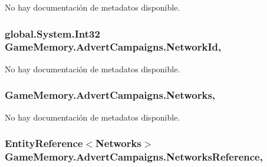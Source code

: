 No hay documentación de metadatos disponible. 

\hypertarget{class_game_memory_1_1_advert_campaigns_ab1f17469e47f312a306fcb0b971a51d8}{
\subsubsection[{Network\-Id}]{\setlength{\rightskip}{0pt plus 5cm}global.\-System.\-Int32 Game\-Memory.\-Advert\-Campaigns.\-Network\-Id\hspace{0.3cm}{\ttfamily [get]}, {\ttfamily [set]}}}\label{class_game_memory_1_1_advert_campaigns_ab1f17469e47f312a306fcb0b971a51d8}


No hay documentación de metadatos disponible. 

\hypertarget{class_game_memory_1_1_advert_campaigns_a93fb9fb1604fb97b196e6cd7186270cf}{
\subsubsection[{Networks}]{ Game\-Memory.\-Advert\-Campaigns.\-Networks\hspace{0.3cm}{\ttfamily [get]}, {\ttfamily [set]}}}\label{class_game_memory_1_1_advert_campaigns_a93fb9fb1604fb97b196e6cd7186270cf}


No hay documentación de metadatos disponible. 

\hypertarget{class_game_memory_1_1_advert_campaigns_a31ed9dd24ca6e2155bc0f19a55053e63}{
\subsubsection[{Networks\-Reference}]{\setlength{\rightskip}{0pt plus 5cm}Entity\-Reference$<${\bf Networks}$>$ Game\-Memory.\-Advert\-Campaigns.\-Networks\-Reference\hspace{0.3cm}{\ttfamily [get]}, {\ttfamily [set]}}}\label{class_game_memory_1_1_advert_campaigns_a31ed9dd24ca6e2155bc0f19a55053e63}


